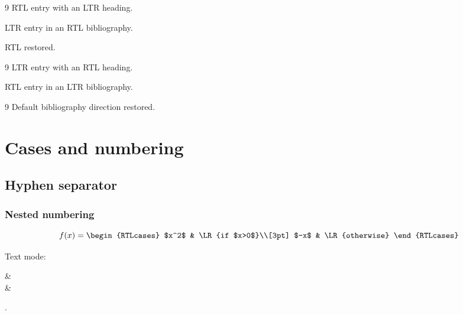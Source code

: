 \documentclass{article}
\begin{document}
\setRTLbibitems
\begin{thebibliography}{9}
     RTL entry with an LTR heading.
    \begin{LTRbibitems}
         LTR entry in an RTL bibliography.
    \end{LTRbibitems}
     RTL restored.
\end{thebibliography}

\begin{RTL}
    \setLTRbibitems
    \begin{thebibliography}{9}
         LTR entry with an RTL heading.
        \begin{RTLbibitems}
             RTL entry in an LTR bibliography.
        \end{RTLbibitems}
    \end{thebibliography}
\end{RTL}

\setdefaultbibitems
\begin{thebibliography}{9}
     Default bibliography direction restored.
\end{thebibliography}

\clearpage
\section{Cases and numbering}

\SepMark{-}
\subsection{Hyphen separator}\label{api:hyphen}
\subsubsection{Nested numbering}

\begin{equation}\label{api:cases}
    f(x)=\begin{RTLcases}
        $x^2$ & \LR{if $x>0$}\\[3pt]
        $-x$  & \LR{otherwise}
    \end{RTLcases}
\end{equation}

Text mode: \begin{RTLcases}
     & \\
     & 
\end{RTLcases}.
\end{document}
